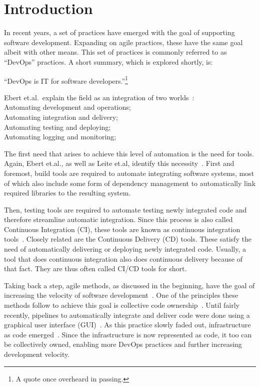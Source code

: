 \chapter{Introduction}
\label{ch:introduction}

In recent years, a set of practices have emerged with the goal of supporting software development.
Expanding on agile practices, these have the same goal albeit with other means.
This set of practices is commonly referred to as ``DevOps'' practices.
A short summary, which is explored shortly, is:

``DevOps is IT for software developers.''\footnote{A quote once overheard in passing.}

Ebert et.al.\ explain the field as an integration of two worlds~\cite{DevOps}: \\
Automating development and operations; \\
Automating integration and delivery; \\
Automating testing and deploying; \\
Automating logging and monitoring;

The first need that arises to achieve this level of automation is the need for tools.
Again, Ebert et.al., as well as Leite et.al, identify this necessity~\cite{DevOps, ASurveyofDevOpsConceptsandChallenges}.
First and foremost, build tools are required to automate integrating software systems, most of which also include some form of dependency management to automatically link required libraries to the resulting system.

Then, testing tools are required to automate testing newly integrated code and therefore streamline automatic integration.
Since this process is also called Continuous Integration (CI), these tools are known as continuous integration tools~\cite{DevOps}.
Closely related are the Continuous Delivery (CD) tools.
These satisfy the need of automatically delivering or deploying newly integrated code.
Usually, a tool that does continuous integration also does continuous delivery because of that fact.
They are thus often called CI/CD tools for short.

\pagebreak

Taking back a step, agile methods, as discussed in the beginning, have the goal of increasing the velocity of software development~\cite{ADecadeOfAgileMethodologies}.
One of the principles these methods follow to achieve this goal is collective code ownership~\cite{CommonAgilePracticesInSoftwareProcesses, ManagingCodeOwnership}.
Until fairly recently, pipelines to automatically integrate and deliver code were done using a graphical user interface (GUI)~\cite{JenkinsClassicUi}.
As this practice slowly faded out, infrastructure as code emerged~\cite{ASystematicMappingStudyOfInfrastructureAsCodeResearch}.
Since the infrastructure is now represented as code, it too can be collectively owned, enabling more DevOps practices and further increasing development velocity.

